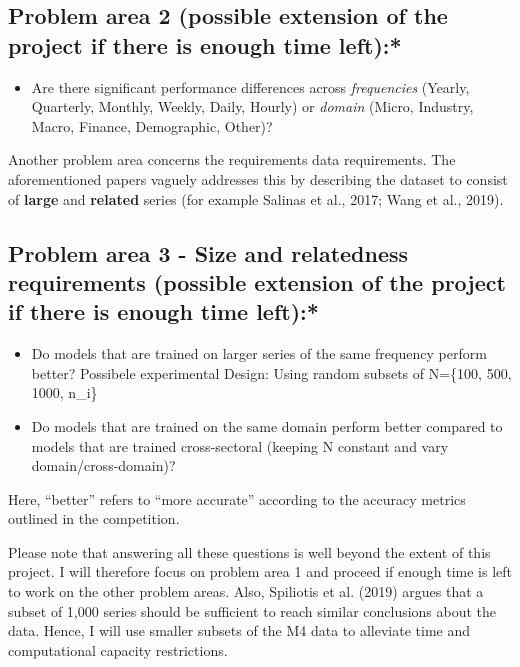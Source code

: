 \documentclass[11pt]{article}
\providecommand{\tightlist}{%
      \setlength{\itemsep}{0pt}\setlength{\parskip}{0pt}}
\begin{document}
\hypertarget{problem-area-2-possible-extension-of-the-project-if-there-is-enough-time-left}{%
\subsection{Problem area 2 (possible extension of the project if there
is enough time
left):*}\label{problem-area-2-possible-extension-of-the-project-if-there-is-enough-time-left}}

\begin{itemize}
\tightlist
\item
  Are there significant performance differences across
  \emph{frequencies} (Yearly, Quarterly, Monthly, Weekly, Daily, Hourly)
  or \emph{domain} (Micro, Industry, Macro, Finance, Demographic,
  Other)?
\end{itemize}

Another problem area concerns the requirements data requirements. The
aforementioned papers vaguely addresses this by describing the dataset
to consist of \textbf{large} and \textbf{related} series (for example
Salinas et al., 2017; Wang et al., 2019).

\hypertarget{problem-area-3---size-and-relatedness-requirements-possible-extension-of-the-project-if-there-is-enough-time-left}{%
\subsection{Problem area 3 - Size and relatedness requirements (possible
extension of the project if there is enough time
left):*}\label{problem-area-3---size-and-relatedness-requirements-possible-extension-of-the-project-if-there-is-enough-time-left}}

\begin{itemize}
\tightlist
\item
  Do models that are trained on larger series of the same frequency
  perform better? Possibele experimental Design: Using random subsets of
  N=\{100, 500, 1000, n\_i\}
\item
  Do models that are trained on the same domain perform better compared
  to models that are trained cross-sectoral (keeping N constant and vary
  domain/cross-domain)?
\end{itemize}

Here, ``better'' refers to ``more accurate'' according to the accuracy
metrics outlined in the competition.

Please note that answering all these questions is well beyond the extent
of this project. I will therefore focus on problem area 1 and proceed if
enough time is left to work on the other problem areas. Also, Spiliotis
et al. (2019) argues that a subset of 1,000 series should be sufficient
to reach similar conclusions about the data. Hence, I will use smaller
subsets of the M4 data to alleviate time and computational capacity
restrictions.
\end{document}

